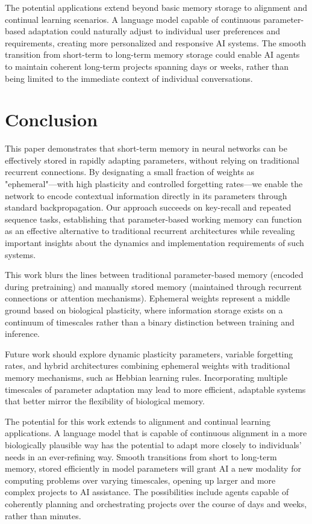 \documentclass{article} %
\begin{document}
The potential applications extend beyond basic memory storage to alignment and continual learning scenarios. A language model capable of continuous parameter-based adaptation could naturally adjust to individual user preferences and requirements, creating more personalized and responsive AI systems. The smooth transition from short-term to long-term memory storage could enable AI agents to maintain coherent long-term projects spanning days or weeks, rather than being limited to the immediate context of individual conversations.

\section{Conclusion}

This paper demonstrates that short-term memory in neural networks can be effectively stored in rapidly adapting parameters, without relying on traditional recurrent connections. By designating a small fraction of weights as "ephemeral"—with high plasticity and controlled forgetting rates—we enable the network to encode contextual information directly in its parameters through standard backpropagation. Our approach succeeds on key-recall and repeated sequence tasks, establishing that parameter-based working memory can function as an effective alternative to traditional recurrent architectures while revealing important insights about the dynamics and implementation requirements of such systems.

This work blurs the lines between traditional parameter-based memory (encoded during pretraining) and manually stored memory (maintained through recurrent connections or attention mechanisms). Ephemeral weights represent a middle ground based on biological plasticity, where information storage exists on a continuum of timescales rather than a binary distinction between training and inference.

Future work should explore dynamic plasticity parameters, variable forgetting rates, and hybrid architectures combining ephemeral weights with traditional memory mechanisms, such as Hebbian learning rules. Incorporating multiple timescales of parameter adaptation may lead to more efficient, adaptable systems that better mirror the flexibility of biological memory.

The potential for this work extends to alignment and continual learning applications. A language model that is capable of continuous alignment in a more biologically plausible way has the potential to adapt more closely to individuals' needs in an ever-refining way. Smooth transitions from short to long-term memory, stored efficiently in model parameters will grant AI a new modality for computing problems over varying timescales, opening up larger and more complex projects to AI assistance. The possibilities include agents capable of coherently planning and orchestrating projects over the course of days and weeks, rather than minutes.



\end{document}
